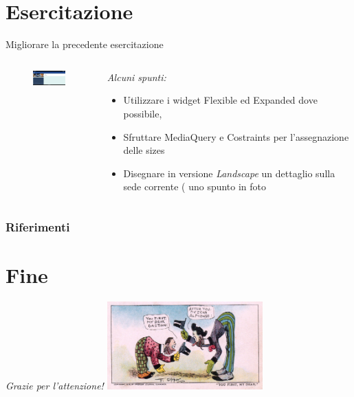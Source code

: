 \documentclass{../libs/presentation_format}
\begin{document}
\section{Esercitazione}
\begin{frame}{Migliorare la precedente esercitazione}
	\begin{minipage}[0.2\textheight]{\textwidth}
		\begin{columns}[T]
			\begin{column}{0.4\textwidth}
				\begin{figure}[htpb]
					\centering
					\includegraphics[width=3cm]{../libs/assignment-home-landscape}
				\end{figure}
			\end{column}
			\begin{column}{0.6\textwidth}
				\emph{Alcuni spunti:}
				\begin{itemize}
					\item Utilizzare i widget Flexible ed Expanded dove possibile,
					\item Sfruttare MediaQuery e Costraints per l'assegnazione delle sizes
					\item Disegnare in versione \emph{Landscape} un dettaglio sulla sede corrente ( uno spunto in foto
				\end{itemize}
			\end{column}
		\end{columns}
	\end{minipage}
\end{frame}



\begin{frame}[allowframebreaks]
    \frametitle{Riferimenti}
    \printbibliography
\end{frame}

\section{Fine}
\begin{frame}{}
	\huge\emph{Grazie per l'attenzione!}
	\newline
	\vfill
	\hfill\includegraphics[width=6cm]{../libs/alphonse-gaston-regards}
\end{frame}
\end{document}
